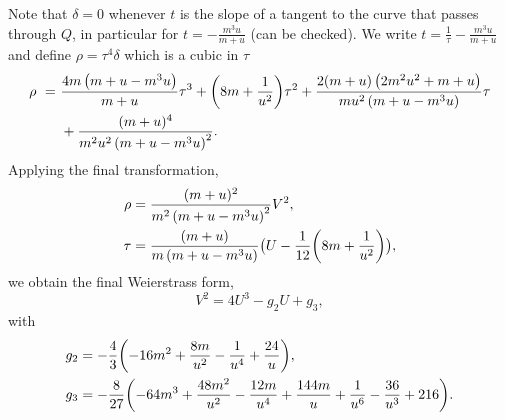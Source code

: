 \documentclass[11pt, a4paper]{article}
\numberwithin{equation}{section}
\begin{document}
Note that $\delta = 0$ whenever $t$ is the slope of a tangent to the curve that passes through $Q$, in particular for $t = -\frac{m^3 u}{m+u}$ (can be checked). We write $t = \frac{1}{\tau} -\frac{m^3 u}{m+u}$ and define $\rho = \tau^4 \delta$ which is a cubic in $\tau$
\begin{equation}
  \begin{split}
    \rho \ = \ &\frac{4 m \left(m+u-m^3 u\right)}{m+u} \tau^3 + \qty(8 m+\frac{1}{u^2}) \tau^2 + \frac{2 (m+u) \left(2 m^2 u^2+m+u\right)}{m u^2 \left(m+u-m^3 u\right)} \tau \\
    & + \frac{(m+u)^4}{m^2 u^2 \left(m+u-m^3 u\right)^2}.
  \end{split}
\end{equation}
Applying the final transformation,
\begin{align}
  \rho &= \frac{(m+u)^2}{m^2 \left(m+u-m^3 u\right)^2} V^2, \\
  \tau &= \frac{(m+u)}{m \left(m+u-m^3 u\right)} \bigl( U - \frac{1}{12} \qty(8 m+\frac{1}{u^2}) \bigr),
\end{align}
we obtain the final Weierstrass form,
\begin{equation}
  V^2 = 4 U^3 - g_2 U + g_3,
\end{equation}
with
\begin{align}\label{eq:F1g23Nagell}
  g_2 &= -\frac{4}{3} \qty(-16 m^2+\frac{8 m}{u^2}-\frac{1}{u^4}+\frac{24}{u}), \\
  g_3 &= -\frac{8}{27} \qty(-64 m^3+\frac{48 m^2}{u^2}-\frac{12 m}{u^4}+\frac{144 m}{u}+\frac{1}{u^6}-\frac{36}{u^3}+216).
\end{align}
\end{document}

